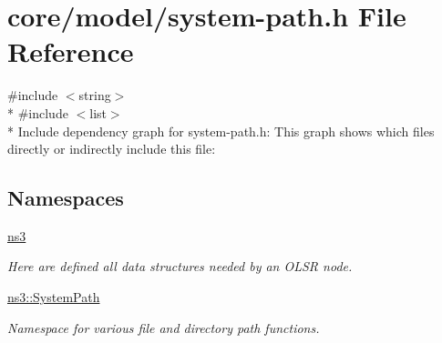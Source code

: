 \hypertarget{system-path_8h}{}\section{core/model/system-\/path.h File Reference}
\label{system-path_8h}
{\ttfamily \#include $<$string$>$}\\*
{\ttfamily \#include $<$list$>$}\\*
Include dependency graph for system-\/path.h\+:
This graph shows which files directly or indirectly include this file\+:
\subsection*{Namespaces}
\begin{DoxyCompactItemize}
\item 
 \hyperlink{namespacens3}{ns3}
\begin{DoxyCompactList}\small\item\em Here are defined all data structures needed by an O\+L\+SR node. \end{DoxyCompactList}\item 
 \hyperlink{namespacens3_1_1SystemPath}{ns3\+::\+System\+Path}
\begin{DoxyCompactList}\small\item\em Namespace for various file and directory path functions. \end{DoxyCompactList}\end{DoxyCompactItemize}

